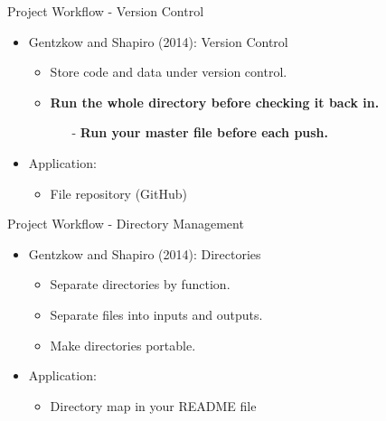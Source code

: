 \documentclass{beamer}
\begin{document}
\begin{frame}{Project Workflow - Version Control}
    \begin{itemize}
        \item Gentzkow and Shapiro (2014): Version Control
            \begin{itemize}
                \item Store code and data under version control.
                \item \textbf{Run the whole directory before checking it back in.}
                    \begin{itemize}
                        \item[-] \textbf{Run your master file before each push.} 
                    \end{itemize}
            \end{itemize}
        \medskip
        \item Application:
            \begin{itemize}
                \item File repository (GitHub)
            \end{itemize}
    \end{itemize}
\end{frame}

\begin{frame}{Project Workflow - Directory Management}
    \begin{itemize}
        \item Gentzkow and Shapiro (2014): Directories
            \begin{itemize}
                \item Separate directories by function.
                \item Separate files into inputs and outputs.
                \item Make directories portable.
            \end{itemize}
        \medskip
        \item Application:
            \begin{itemize}
                \item Directory map in your README file
            \end{itemize}
    \end{itemize}
\end{frame}
\end{document}

